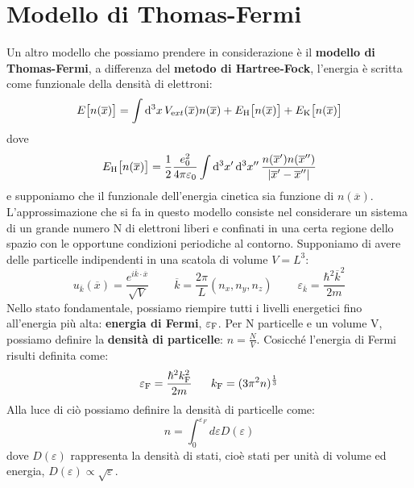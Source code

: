 \section{Modello di Thomas-Fermi}
Un altro modello che possiamo prendere in considerazione è il \textbf{modello di Thomas-Fermi}, a differenza del \textbf{metodo di Hartree-Fock}, l'energia è scritta come funzionale della densità di elettroni:
\begin{equation*}
    E\big[n(\overline x)\big]=\int \dd[3]{x}V_{\text ext}(\overline x)n(\overline x)+E_{\text H}\big[n(\overline x)\big]+E_{\text K}\big[n(\overline x)\big]
\end{equation*}
dove
\begin{equation*}
    E_{\text H}\big[n(\overline x)\big]=\frac 12 \frac{e_0^2}{4\pi\varepsilon_0}\int \dd[3]{x'}\dd[3]{x''}\frac{n(\overline{x}')n(\overline{x}'')}{|\overline{x}'-\overline{x}''|}
\end{equation*}
e supponiamo che il funzionale dell'energia cinetica sia funzione di $n(\overline x)$.\\
L'approssimazione che si fa in questo modello consiste nel considerare un sistema di un grande numero N di elettroni liberi e confinati in una certa regione dello spazio con le opportune condizioni periodiche al contorno. Supponiamo di avere delle particelle indipendenti in una scatola di volume $V=L^3$:
\begin{equation*}
    u_{\overline k}(\overline x)=\frac{e^{i\overline k \cdot \overline x}}{\sqrt V} \ \ \ \ \ \ \ \ \ \  \overline k = \frac{2\pi}{L}(n_x,n_y,n_z) \ \ \ \ \ \ \ \ \ \ \varepsilon_{\overline k}=\frac{\hbar^2\overline{k}^2}{2m}
\end{equation*}
Nello stato fondamentale, possiamo riempire tutti i livelli energetici fino all'energia più alta: \textbf{energia di Fermi}, $\varepsilon_{\text F}$.
Per N particelle e un volume V, possiamo definire la \textbf{densità di particelle}: $n=\frac NV$. Cosicché l'energia di Fermi risulti definita come:
\begin{equation*}
    \varepsilon_{\text F}=\frac{\hbar^2k_{\text F}^2}{2m} \ \ \ \ \ k_{\text F}=(3\pi^2n)^{\frac 13}
\end{equation*}
Alla luce di ciò possiamo definire la densità di particelle come:
\begin{equation*}
    n=\int_0^{\varepsilon_F}d\varepsilon D(\varepsilon)
\end{equation*}
dove $D(\varepsilon)$ rappresenta la densità di stati, cioè stati per unità di volume ed energia, $D(\varepsilon)\propto\sqrt\varepsilon$.
